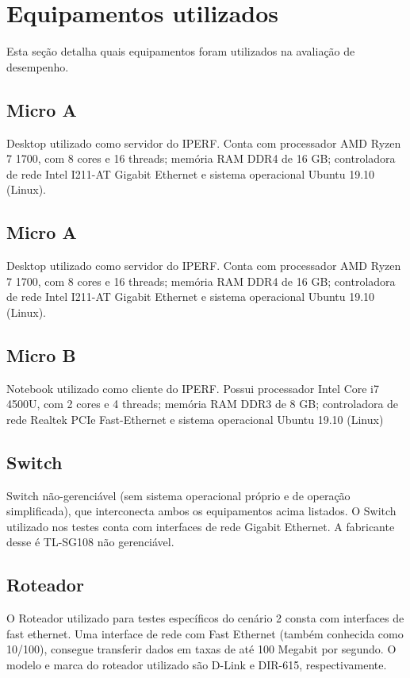 \documentclass[12pt]{article}
\begin{document}
\section{Equipamentos utilizados}

Esta seção detalha quais equipamentos foram utilizados na avaliação de desempenho.

\subsection{Micro A}

Desktop utilizado como servidor do IPERF. Conta com processador AMD Ryzen 7 1700, com 8 cores e 16 threads; memória RAM DDR4 de 16 GB; controladora de rede Intel I211-AT Gigabit Ethernet e sistema operacional Ubuntu 19.10 (Linux). 

\subsection{Micro A}

Desktop utilizado como servidor do IPERF. Conta com processador AMD Ryzen 7 1700, com 8 cores e 16 threads; memória RAM DDR4 de 16 GB; controladora de rede Intel I211-AT Gigabit Ethernet e sistema operacional Ubuntu 19.10 (Linux). 

\subsection{Micro B}

Notebook utilizado como cliente do IPERF. Possui processador Intel Core i7 4500U, com 2 cores e 4 threads; memória RAM DDR3 de 8 GB; controladora de rede Realtek PCIe Fast-Ethernet e sistema operacional Ubuntu 19.10 (Linux) 

\subsection{Switch}

Switch não-gerenciável (sem sistema operacional próprio e de operação simplificada), que interconecta ambos os equipamentos acima listados. O Switch utilizado nos testes conta com interfaces de rede Gigabit Ethernet. A fabricante desse é TL-SG108 não gerenciável. 

\subsection{Roteador}

O Roteador utilizado para testes específicos do cenário 2 consta com interfaces de fast ethernet. Uma interface de rede com Fast Ethernet (também conhecida como 10/100), consegue transferir dados em taxas de até 100 Megabit por segundo. O modelo e marca do roteador utilizado são D-Link e DIR-615, respectivamente.
\end{document}

